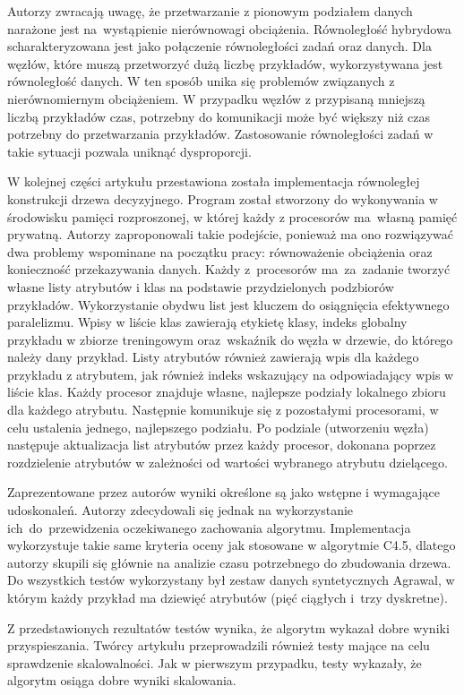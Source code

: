 \documentclass[12pt]{article}
\begin{document}
Autorzy zwracają uwagę, że przetwarzanie z pionowym podziałem danych narażone jest na~wystąpienie nierównowagi obciążenia.
Równoległość hybrydowa scharakteryzowana jest jako połączenie równoległości zadań oraz danych. Dla węzłów, które muszą przetworzyć dużą liczbę przykładów, wykorzystywana
jest równoległość danych. W ten sposób unika się problemów związanych z nierównomiernym obciążeniem. W przypadku węzłów z przypisaną mniejszą liczbą przykładów
czas, potrzebny do komunikacji może być większy niż czas potrzebny do przetwarzania przykładów. Zastosowanie równoległości zadań w takie sytuacji pozwala uniknąć dysproporcji.

W kolejnej części artykułu przestawiona została implementacja równoległej konstrukcji drzewa decyzyjnego. Program został stworzony do wykonywania w środowisku pamięci
rozproszonej, w której każdy z procesorów ma~własną pamięć prywatną. Autorzy zaproponowali takie podejście, ponieważ ma ono rozwiązywać dwa problemy wspominane na
początku pracy: równoważenie obciążenia oraz konieczność przekazywania danych. Każdy z~procesorów ma~za~zadanie tworzyć własne listy atrybutów i klas na podstawie
przydzielonych podzbiorów przykładów. Wykorzystanie obydwu list jest kluczem do osiągnięcia efektywnego paralelizmu. Wpisy w liście klas zawierają etykietę klasy, indeks
globalny przykładu w zbiorze treningowym oraz~wskaźnik do węzła w drzewie, do którego należy dany przykład. Listy atrybutów również zawierają wpis dla każdego przykładu
z atrybutem, jak również indeks wskazujący na odpowiadający wpis w liście klas. Każdy procesor znajduje własne, najlepsze podziały lokalnego zbioru dla każdego atrybutu.
Następnie komunikuje się z pozostałymi procesorami, w celu ustalenia jednego, najlepszego podziału. Po podziale (utworzeniu węzła) następuje aktualizacja list atrybutów
przez każdy procesor, dokonana poprzez rozdzielenie atrybutów w zależności od wartości wybranego atrybutu dzielącego.

Zaprezentowane przez autorów wyniki określone są jako wstępne i wymagające udoskonaleń. Autorzy zdecydowali się jednak na wykorzystanie ich~do~przewidzenia oczekiwanego
zachowania algorytmu. Implementacja wykorzystuje takie same kryteria oceny jak stosowane w algorytmie C4.5, dlatego autorzy skupili się głównie na analizie czasu potrzebnego do
zbudowania drzewa. Do wszystkich testów wykorzystany był zestaw danych syntetycznych Agrawal, w którym każdy przykład ma dziewięć atrybutów (pięć ciągłych i~trzy dyskretne).

Z przedstawionych rezultatów testów wynika, że algorytm wykazał dobre wyniki przyspieszania. Twórcy artykułu przeprowadzili również testy mające na celu sprawdzenie skalowalności.
Jak w pierwszym przypadku, testy wykazały, że algorytm osiąga dobre wyniki skalowania.
\end{document}
